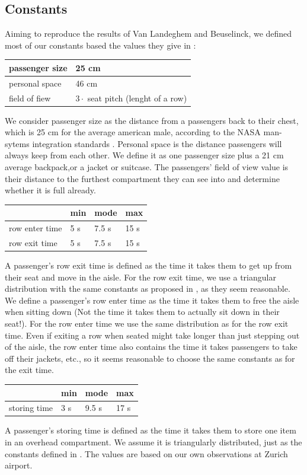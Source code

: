 \documentclass[11pt]{article}
\begin{document}
\subsection{Constants}
Aiming to reproduce the results of Van Landeghem and Beuselinck, we defined most of our constants based the values they give in \cite{beus}:

\begin{tabular}{l|l}

	\hline
	passenger size & 25 cm \\
	\hline
	personal space & 46 cm\\
	\hline
	field of fiew & $3 \cdot$ seat pitch (lenght of a row)\\
	\hline
\end{tabular}
	We consider passenger size as the distance from a passengers back to their chest, which is 25 cm for the average american male, according to the NASA man-sytems integration standards \cite{nasa}. Personal space is the distance passengers will always keep from each other. We define it as one passenger size plus a 21 cm average backpack,or a jacket or suitcase.
	The passengers' field of view value is their distance to the furthest compartment they can see into and determine whether it is full already.

\begin{tabular}{l|l l l}

	&min &mode&max \\
	\hline
row enter time & 5 s &7.5 s & 15 s \\
	\hline
	row exit time& 5 s &7.5 s & 15 s \\
	\hline
\end{tabular}
A passenger's row exit time is defined as the time it takes them to get up from their seat and move in the aisle. For the row exit time, we use a triangular distribution with the same constants as proposed in \cite{beus}, as they seem reasonable. We define a passenger's row enter time as the time it takes them to free the aisle when sitting down (Not the time it takes them to actually sit down in their seat!). For the row enter time we use the same distribution as for the row exit time. Even if exiting a row when seated might take longer than just stepping out of the aisle, the row enter time also contains the time it takes passengers to take off their jackets, etc., so it seems reasonable to choose the same constants as for the exit time.

\begin{tabular}{l|l l l}

	&min &mode&max \\
	\hline
storing time & 3 s &9.5 s & 17 s \\
	\hline

	\end{tabular}
A passenger's storing time is defined as the time it takes them to store one item in an overhead compartment. We assume it is triangularly distributed, just as the constants defined in \cite{beus}. The values are based on our own observations at Zurich airport.
\end{document}
